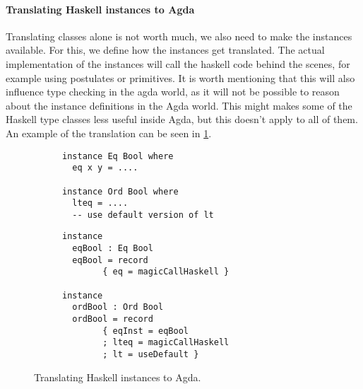\documentclass[12pt, a4paper, twoside]{report}
\begin{document}
\paragraph{Translating Haskell instances to Agda}
Translating classes alone is not worth much, we also need to make the
instances available. For this, we define how the instances get translated.
The actual implementation of the instances will call the haskell code
behind the scenes, for example using postulates or primitives. It is worth mentioning
that this will also influence type checking in the agda world, as it will not be
possible to reason about the instance definitions in the Agda world. This might makes some
of the Haskell type classes less useful inside Agda, but this doesn't apply to all of them.
An example of the translation can be seen in \ref{lst:inst-hs-agda}.
\begin{figure}
\begin{subfigure}[b]{0.5\textwidth}
\begin{lstlisting}
instance Eq Bool where
  eq x y = ....

instance Ord Bool where
  lteq = ....
  -- use default version of lt
\end{lstlisting}
\end{subfigure}
\hspace{10pt}
\begin{subfigure}[b]{0.5\textwidth}
\begin{lstlisting}
instance
  eqBool : Eq Bool
  eqBool = record
        { eq = magicCallHaskell }

instance
  ordBool : Ord Bool
  ordBool = record
        { eqInst = eqBool
        ; lteq = magicCallHaskell
        ; lt = useDefault }
\end{lstlisting}
\end{subfigure}
\caption{Translating Haskell instances to Agda.}
\label{lst:inst-hs-agda}
\end{figure}
\end{document}
